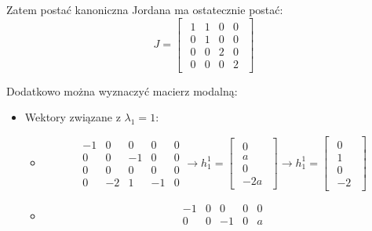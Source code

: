 \documentclass{article}
\begin{document}
Zatem postać kanoniczna Jordana ma ostatecznie postać:
$$
    J
    =
    \begin{bmatrix}\begin{array}{rrrr}
        1   &   1   &   0   &   0\\
        0   &   1   &   0   &   0\\
        0   &   0   &   2   &   0\\
        0   &   0   &   0   &   2
    \end{array}\end{bmatrix}
$$

Dodatkowo można wyznaczyć macierz modalną:
\begin{itemize}
    \item Wektory związane z $\lambda_{1} = 1$:
    \begin{itemize}
        \item
        $$
        \begin{array}{rrrr|r}
           -1   &   0   &   0   &   0   &   0\\
            0   &   0   &  -1   &   0   &   0\\
            0   &   0   &   0   &   0   &   0\\
            0   &  -2   &   1   &  -1   &   0
        \end{array}
        \rightarrow
        h_{1}^{1}
        =
        \begin{bmatrix}\begin{array}{c}
            0\\
            a\\
            0\\
            -2a
        \end{array}\end{bmatrix}
        \rightarrow
        h_{1}^{1}
        =
        \begin{bmatrix}\begin{array}{c}
            0\\
            1\\
            0\\
            -2
        \end{array}\end{bmatrix}
        $$
        \item
        $$
        \begin{array}{rrrr|c}
           -1   &   0   &   0   &   0   &   0\\
            0   &   0   &  -1   &   0   &   a\\

\end{array}$$
\end{itemize}
\end{itemize}
\end{document}
